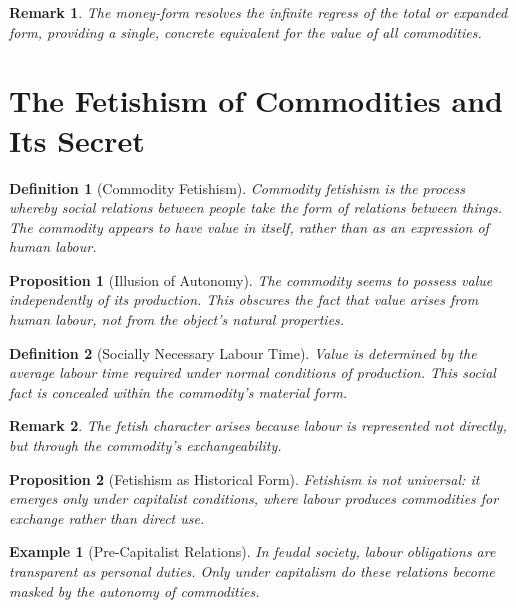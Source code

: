 \documentclass{article}
\newtheorem{innerdef}{Definition}
\newtheorem{innerprop}{Proposition}
\newtheorem{innerex}{Example}
\newtheorem{innerremark}{Remark}
\newenvironment{definition}{\begin{innerdef}}{\end{innerdef}}
\newenvironment{proposition}{\begin{innerprop}}{\end{innerprop}}
\newenvironment{example}{\begin{innerex}}{\end{innerex}}
\newenvironment{remark}{\begin{innerremark}}{\end{innerremark}}
\begin{document}
\begin{remark}
The money-form resolves the infinite regress of the total or expanded form, 
providing a single, concrete equivalent for the value of all commodities.
\end{remark}

\newpage


\section{The Fetishism of Commodities and Its Secret} %

\begin{definition}[Commodity Fetishism]
Commodity fetishism is the process whereby social relations between people 
take the form of relations between things. The commodity appears to have 
value in itself, rather than as an expression of human labour.
\end{definition}

\begin{proposition}[Illusion of Autonomy]
The commodity seems to possess value independently of its production. 
This obscures the fact that value arises from human labour, not from the 
object’s natural properties.
\end{proposition}

\begin{definition}[Socially Necessary Labour Time]
Value is determined by the average labour time required under normal 
conditions of production. This social fact is concealed within the 
commodity’s material form.
\end{definition}

\begin{remark}
The fetish character arises because labour is represented not directly, 
but through the commodity’s exchangeability.
\end{remark}

\begin{proposition}[Fetishism as Historical Form]
Fetishism is not universal: it emerges only under capitalist conditions, where labour produces commodities for exchange rather than direct use.
\end{proposition}

\begin{example}[Pre-Capitalist Relations]
In feudal society, labour obligations are transparent as personal duties. 
Only under capitalism do these relations become masked by the autonomy 
of commodities.
\end{example}
\end{document}
